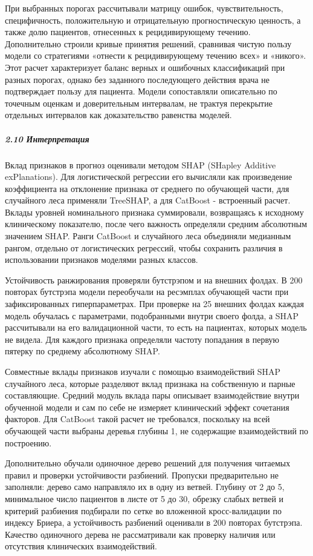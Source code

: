 \documentclass{crm-article}
\begin{document}
При выбранных порогах рассчитывали матрицу ошибок, чувствительность, специфичность, положительную и отрицательную прогностическую ценность, а также долю пациентов, отнесенных к рецидивирующему течению. Дополнительно строили кривые принятия решений, сравнивая чистую пользу модели со стратегиями «отнести к рецидивирующему течению всех» и «никого». Этот расчет характеризует баланс верных и ошибочных классификаций при разных порогах, однако без заданного последующего действия врача не подтверждает пользу для пациента. Модели сопоставляли описательно по точечным оценкам и доверительным интервалам, не трактуя перекрытие отдельных интервалов как доказательство равенства моделей.

\subparagraph{2.10 Интерпретация}\label{subsec2_10}

Вклад признаков в прогноз оценивали методом SHAP (SHapley Additive exPlanations). Для логистической регрессии его вычисляли как произведение коэффициента на отклонение признака от среднего по обучающей части, для случайного леса применяли TreeSHAP, а для CatBoost - встроенный расчет. Вклады уровней номинального признака суммировали, возвращаясь к исходному клиническому показателю, после чего важность определяли средним абсолютным значением SHAP. Ранги CatBoost и случайного леса объединяли медианным рангом, отдельно от логистических регрессий, чтобы сохранить различия в использовании признаков моделями разных классов.

Устойчивость ранжирования проверяли бутстрэпом и на внешних фолдах. В 200 повторах бутстрэпа модели переобучали на ресэмплах обучающей части при зафиксированных гиперпараметрах. При проверке на 25 внешних фолдах каждая модель обучалась с параметрами, подобранными внутри своего фолда, а SHAP рассчитывали на его валидационной части, то есть на пациентах, которых модель не видела. Для каждого признака определяли частоту попадания в первую пятерку по среднему абсолютному SHAP.

Совместные вклады признаков изучали с помощью взаимодействий SHAP случайного леса, которые разделяют вклад признака на собственную и парные составляющие. Средний модуль вклада пары описывает взаимодействие внутри обученной модели и сам по себе не измеряет клинический эффект сочетания факторов. Для CatBoost такой расчет не требовался, поскольку на всей обучающей части выбраны деревья глубины 1, не содержащие взаимодействий по построению.

Дополнительно обучали одиночное дерево решений для получения читаемых правил и проверки устойчивости разбиений. Пропуски предварительно не заполняли: дерево само направляло их в одну из ветвей. Глубину от 2 до 5, минимальное число пациентов в листе от 5 до 30, обрезку слабых ветвей и критерий разбиения подбирали по сетке во вложенной кросс-валидации по индексу Бриера, а устойчивость разбиений оценивали в 200 повторах бутстрэпа. Качество одиночного дерева не рассматривали как проверку наличия или отсутствия клинических взаимодействий.
\end{document}
